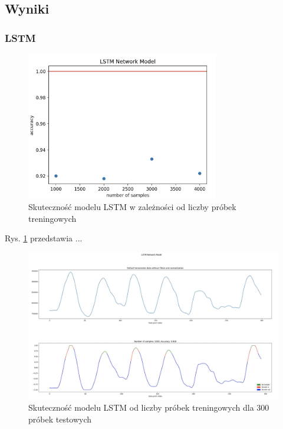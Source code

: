 \documentclass{article}
\begin{document}
\subsection{Wyniki}

\subsubsection{LSTM}

\begin{figure}[H]
    \centering
    \includegraphics[width=0.75\textwidth]{lstm/dokladnosc.png}
    \caption{Skuteczność modelu LSTM w zależności od liczby próbek treningowych}
    \label{fig:data_chart8}
\end{figure}

Rys. \ref{fig:data_chart8} przedstawia ...

\begin{figure}[H]
    \centering
    \includegraphics[width=\textwidth]{lstm/skutecznosc.png}
    \caption{Skuteczność modelu LSTM od liczby próbek treningowych dla 300 próbek testowych}
    \label{fig:data_chart9}
\end{figure}
\end{document}
